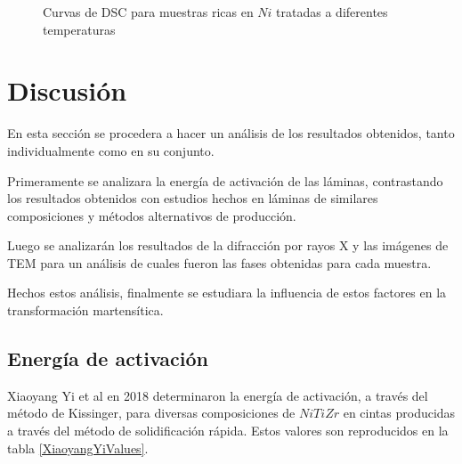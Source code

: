 \documentclass[12pt]{article}
\theoremstyle{definition}
\theoremstyle{remark}
\begin{document}
{\begin{figure}[H]
\noindent{}
	
 \caption{Curvas de DSC para muestras ricas en $Ni$ tratadas a diferentes temperaturas}
\label{DSCNiRich}

\end{figure}

\newpage

\section{Discusión}
En esta sección se procedera a hacer un análisis de los resultados obtenidos, tanto individualmente como en su conjunto.

Primeramente se analizara la energía de activación de las láminas, contrastando los resultados obtenidos con estudios hechos en láminas de similares composiciones y métodos alternativos de producción.

Luego se analizarán los resultados de la difracción por rayos X y las imágenes de TEM para un análisis de cuales fueron las fases obtenidas para cada muestra.

Hechos estos análisis, finalmente se estudiara la influencia de estos factores en la transformación martensítica.
\subsection{Energía de activación}

Xiaoyang Yi et al \cite{XiaoyangYi2018} en 2018 determinaron la energía de activación, a través del método de Kissinger, para diversas composiciones de $NiTiZr$ en cintas producidas a través del método de solidificación rápida. Estos valores son reproducidos en la tabla \ref{XiaoyangYiValues}.

}
\end{document}
